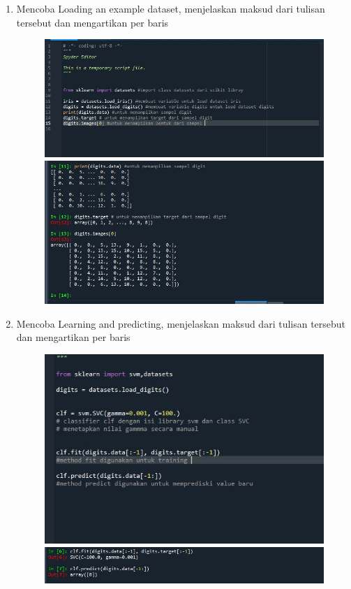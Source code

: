 \begin{enumerate}
\item
Mencoba Loading an example dataset, menjelaskan maksud dari tulisan tersebut dan mengartikan per baris
\begin{figure}[!htbp]
    \centering
    \includegraphics[scale=0.4]{figures/3.JPG}
    \includegraphics[scale=0.3]{figures/3.1.JPG}
    \end{figure}

\newpage
\item
Mencoba Learning and predicting, menjelaskan maksud dari tulisan tersebut dan mengartikan per baris
\begin{figure}[!htbp]
    \centering
    \includegraphics[scale=0.4]{figures/4.JPG}
    \includegraphics[scale=0.4]{figures/4.1.JPG}
    \end{figure}



\end{enumerate}
